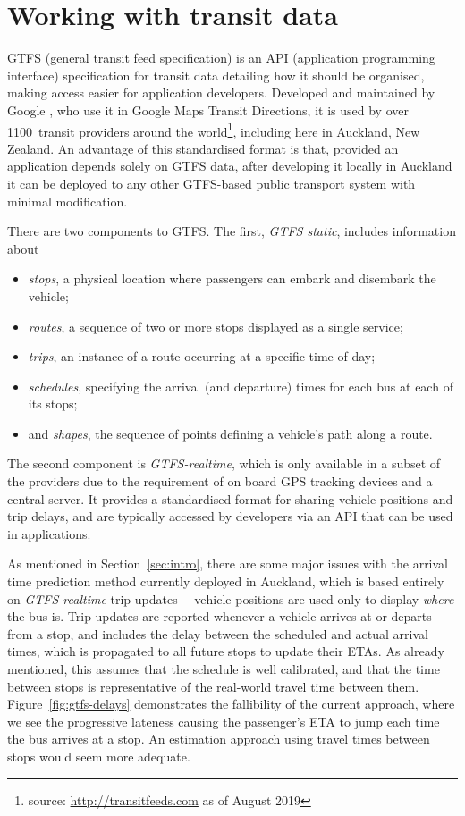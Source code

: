 \section{Working with \rt transit data}
\label{sec:gtfs}

GTFS (general transit feed specification)
is an API (application programming interface) specification for transit data
detailing how it should be organised,
making access easier for application developers.
Developed and maintained by Google \citep{GoogleDevelopers_2006},
who use it in Google Maps Transit Directions,
it is used by over 1100~transit providers around the world\footnote{%
source: \url{http://transitfeeds.com} as of August 2019},
including here in Auckland, New Zealand.
An advantage of this standardised format is that,
provided an application depends solely on GTFS data,
after developing it locally in Auckland it can be deployed to any other GTFS-based
public transport system with minimal modification.


There are two components to GTFS.
The first, \emph{GTFS static}, includes information about
\begin{itemize}
\item \emph{stops}, a physical location where passengers can embark and disembark the vehicle;
\item \emph{routes}, a sequence of two or more stops displayed as a single service;
\item \emph{trips}, an instance of a route occurring at a specific time of day;
\item \emph{schedules}, specifying the arrival (and departure) times for each bus at each of its stops; 
\item and \emph{shapes}, the sequence of points defining a vehicle's path along a route.
\end{itemize}
The second component is \emph{GTFS-realtime},
which is only available in a subset of the providers due to the requirement of 
on board GPS tracking devices and a central server.
It provides a standardised format for sharing vehicle positions and trip delays,
and are typically accessed by developers via an API that can be used in \rt applications.

As mentioned in Section~\ref{sec:intro},
there are some major issues with the arrival time prediction method currently
deployed in Auckland,
which is based entirely on \emph{GTFS-realtime} trip updates---%
vehicle positions are used only to display \emph{where} the bus is.
Trip updates are reported whenever a vehicle arrives at or departs from a stop,
and includes the delay between the scheduled and actual arrival times,
which is propagated to all future stops to update their ETAs.
As already mentioned, this assumes that the schedule is well calibrated,
and that the time between stops
is representative of the real-world travel time between them. 
Figure~\ref{fig:gtfs-delays} demonstrates the fallibility of the current approach,
where we see the progressive lateness causing the passenger's ETA to 
jump each time the bus arrives at a stop.
An estimation approach using \rt travel times 
between stops would seem more adequate.

